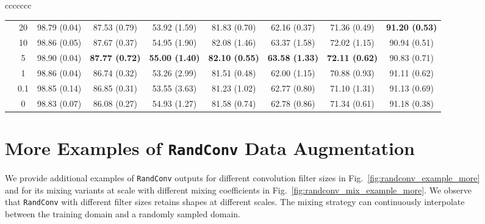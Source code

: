 \documentclass{article} \usepackage{iclr2021_conference,times}
\newcommand{\RandConv}{\texttt{RandConv}}
\begin{document}
\begin{figure}[t]
\begin{center}
\begin{adjustbox}{max width=\textwidth}
\begin{tabular}{ccccccc}
\begin{table}[htp]
\begin{tabular}{l|c|c|ccccc|c}
		\midrule
		\multirow{6}{*}{} & 20  & 98.79 \tiny(0.04) & 87.53 \tiny(0.79)          & 53.92 \tiny(1.59)          & 81.83 \tiny(0.70)          & 62.16 \tiny(0.37)          & 71.36 \tiny(0.49)          & \textbf{91.20 \tiny(0.53)}          \\
		& 10  & 98.86 \tiny(0.05) & 87.67 \tiny(0.37)          & 54.95 \tiny(1.90)          & 82.08 \tiny(1.46)          & 63.37 \tiny(1.58)          & 72.02 \tiny(1.15)          & 90.94 \tiny(0.51)          \\
		& 5   & 98.90 \tiny(0.04) & \textbf{87.77 \tiny(0.72)} & \textbf{55.00 \tiny(1.40)} & \textbf{82.10 \tiny(0.55)} & \textbf{63.58 \tiny(1.33)} & \textbf{72.11 \tiny(0.62)} & {90.83 \tiny(0.71)}          \\
		& 1   & 98.86 \tiny(0.04) & 86.74 \tiny(0.32)          & 53.26 \tiny(2.99)          & 81.51 \tiny(0.48)          & 62.00 \tiny(1.15)          & 70.88 \tiny(0.93)          & 91.11 \tiny(0.62)          \\
		& 0.1 & 98.85 \tiny(0.14) & 86.85 \tiny(0.31)          & 53.55 \tiny(3.63)          & 81.23 \tiny(1.02)          & 62.77 \tiny(0.80)          & 71.10 \tiny(1.31)          & 91.13 \tiny(0.69)          \\
		& 0   & 98.83 \tiny(0.07) & 86.08 \tiny(0.27)          & 54.93 \tiny(1.27)          & 81.58 \tiny(0.74)          & 62.78 \tiny(0.86)          & 71.34 \tiny(0.61)          & 91.18 \tiny(0.38)          \\
		
\bottomrule
	\end{tabular}
\end{table}
\newpage

\section{More Examples of {\RandConv} Data Augmentation}
\label{examples}
We provide additional examples of {\RandConv} outputs for different convolution filter sizes in Fig.~\ref{fig:randconv_example_more} and for its mixing variants at scale  with different mixing coefficients in Fig.~\ref{fig:randconv_mix_example_more}. We observe that {\RandConv} with different filter sizes retains shapes at different scales. The mixing strategy can continuously interpolate between the training domain and a randomly sampled domain.  





\end{tabular}
\end{adjustbox}
\end{center}
\end{figure}
\end{document}
